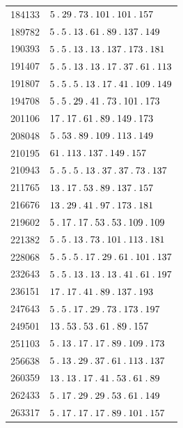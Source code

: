 %
\begingroup\small\setlength{\tabcolsep}{5pt}
\begin{longtable}{@{}r|l@{}}
184133 & $5\pdot 29\pdot 73\pdot 101\pdot 101\pdot 157$\\
189782 & $5\pdot 5\pdot 13\pdot 61\pdot 89\pdot 137\pdot 149$\\
190393 & $5\pdot 5\pdot 13\pdot 13\pdot 137\pdot 173\pdot 181$\\
191407 & $5\pdot 5\pdot 13\pdot 13\pdot 17\pdot 37\pdot 61\pdot 113$\\
191807 & $5\pdot 5\pdot 5\pdot 13\pdot 17\pdot 41\pdot 109\pdot 149$\\
194708 & $5\pdot 5\pdot 29\pdot 41\pdot 73\pdot 101\pdot 173$\\
201106 & $17\pdot 17\pdot 61\pdot 89\pdot 149\pdot 173$\\
208048 & $5\pdot 53\pdot 89\pdot 109\pdot 113\pdot 149$\\
210195 & $61\pdot 113\pdot 137\pdot 149\pdot 157$\\
210943 & $5\pdot 5\pdot 5\pdot 13\pdot 37\pdot 37\pdot 73\pdot 137$\\
211765 & $13\pdot 17\pdot 53\pdot 89\pdot 137\pdot 157$\\
216676 & $13\pdot 29\pdot 41\pdot 97\pdot 173\pdot 181$\\
219602 & $5\pdot 17\pdot 17\pdot 53\pdot 53\pdot 109\pdot 109$\\
221382 & $5\pdot 5\pdot 13\pdot 73\pdot 101\pdot 113\pdot 181$\\
228068 & $5\pdot 5\pdot 5\pdot 17\pdot 29\pdot 61\pdot 101\pdot 137$\\
232643 & $5\pdot 5\pdot 13\pdot 13\pdot 13\pdot 41\pdot 61\pdot 197$\\
236151 & $17\pdot 17\pdot 41\pdot 89\pdot 137\pdot 193$\\
247643 & $5\pdot 5\pdot 17\pdot 29\pdot 73\pdot 173\pdot 197$\\
249501 & $13\pdot 53\pdot 53\pdot 61\pdot 89\pdot 157$\\
251103 & $5\pdot 13\pdot 17\pdot 17\pdot 89\pdot 109\pdot 173$\\
256638 & $5\pdot 13\pdot 29\pdot 37\pdot 61\pdot 113\pdot 137$\\
260359 & $13\pdot 13\pdot 17\pdot 41\pdot 53\pdot 61\pdot 89$\\
262433 & $5\pdot 17\pdot 29\pdot 29\pdot 53\pdot 61\pdot 149$\\
263317 & $5\pdot 17\pdot 17\pdot 17\pdot 89\pdot 101\pdot 157$\\

\end{longtable}
